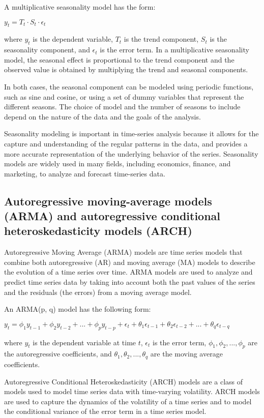 \documentclass[12pt, a4paper, oneside]{article}
\begin{document}
A multiplicative seasonality model has the form:

$y_t = T_t \cdot S_t \cdot \epsilon_t$

where $y_t$ is the dependent variable, $T_t$ is the trend component, $S_t$ is the seasonality component, and $\epsilon_t$ is the error term. In a multiplicative seasonality model, the seasonal effect is proportional to the trend component and the observed value is obtained by multiplying the trend and seasonal components.

In both cases, the seasonal component can be modeled using periodic functions, such as sine and cosine, or using a set of dummy variables that represent the different seasons. The choice of model and the number of seasons to include depend on the nature of the data and the goals of the analysis.

Seasonality modeling is important in time-series analysis because it allows for the capture and understanding of the regular patterns in the data, and provides a more accurate representation of the underlying behavior of the series. Seasonality models are widely used in many fields, including economics, finance, and marketing, to analyze and forecast time-series data.
\subsection{ Autoregressive moving-average models (ARMA) and autoregressive conditional heteroskedasticity models (ARCH)  }

Autoregressive Moving Average (ARMA) models are time series models that combine both autoregressive (AR) and moving average (MA) models to describe the evolution of a time series over time. ARMA models are used to analyze and predict time series data by taking into account both the past values of the series and the residuals (the errors) from a moving average model.

An ARMA(p, q) model has the following form:

$y_t = \phi_1 y_{t-1} + \phi_2 y_{t-2} + ... + \phi_p y_{t-p} + \epsilon_t + \theta_1 \epsilon_{t-1} + \theta_2 \epsilon_{t-2} + ... + \theta_q \epsilon_{t-q}$

where $y_t$ is the dependent variable at time $t$, $\epsilon_t$ is the error term, $\phi_1, \phi_2, ..., \phi_p$ are the autoregressive coefficients, and $\theta_1, \theta_2, ..., \theta_q$ are the moving average coefficients.

Autoregressive Conditional Heteroskedasticity (ARCH) models are a class of models used to model time series data with time-varying volatility. ARCH models are used to capture the dynamics of the volatility of a time series and to model the conditional variance of the error term in a time series model.
\end{document}

